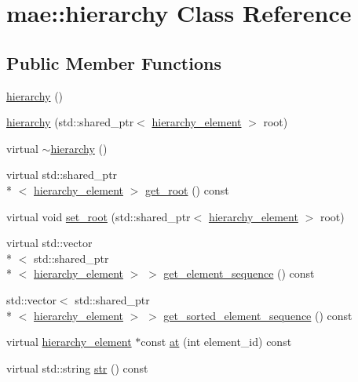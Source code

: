 \hypertarget{classmae_1_1hierarchy}{\section{mae\-:\-:hierarchy Class Reference}
\label{classmae_1_1hierarchy}
}
\subsection*{Public Member Functions}
\begin{DoxyCompactItemize}
\item 
\hyperlink{classmae_1_1hierarchy_ad8006ba53f5228fa32e5040eba48a2ba}{hierarchy} ()
\item 
\hyperlink{classmae_1_1hierarchy_a078873a827d93987db7b149a698144f7}{hierarchy} (std\-::shared\-\_\-ptr$<$ \hyperlink{classmae_1_1hierarchy__element}{hierarchy\-\_\-element} $>$ root)
\item 
virtual \hyperlink{classmae_1_1hierarchy_a24cca85994f8bac7c078f0f2b63f37cd}{$\sim$hierarchy} ()
\item 
virtual std\-::shared\-\_\-ptr\\*
$<$ \hyperlink{classmae_1_1hierarchy__element}{hierarchy\-\_\-element} $>$ \hyperlink{classmae_1_1hierarchy_a67f50abac7cdceff6b2d4a2e5db80e1c}{get\-\_\-root} () const 
\item 
virtual void \hyperlink{classmae_1_1hierarchy_ab4f151f5e91d7078d41e9b0d65ea88df}{set\-\_\-root} (std\-::shared\-\_\-ptr$<$ \hyperlink{classmae_1_1hierarchy__element}{hierarchy\-\_\-element} $>$ root)
\item 
virtual std\-::vector\\*
$<$ std\-::shared\-\_\-ptr\\*
$<$ \hyperlink{classmae_1_1hierarchy__element}{hierarchy\-\_\-element} $>$ $>$ \hyperlink{classmae_1_1hierarchy_af1fbbc883b5b1d0c52974308a228a853}{get\-\_\-element\-\_\-sequence} () const 
\item 
std\-::vector$<$ std\-::shared\-\_\-ptr\\*
$<$ \hyperlink{classmae_1_1hierarchy__element}{hierarchy\-\_\-element} $>$ $>$ \hyperlink{classmae_1_1hierarchy_ad50fb8568b8db8e71399693831bd914f}{get\-\_\-sorted\-\_\-element\-\_\-sequence} () const 
\item 
virtual \hyperlink{classmae_1_1hierarchy__element}{hierarchy\-\_\-element} $\ast$const \hyperlink{classmae_1_1hierarchy_abc29a6cb37845624d40680f1c01ebd96}{at} (int element\-\_\-id) const 
\item 
virtual std\-::string \hyperlink{classmae_1_1hierarchy_a09756b507aa2fefb8e54f854333aa93d}{str} () const 
\end{DoxyCompactItemize}
